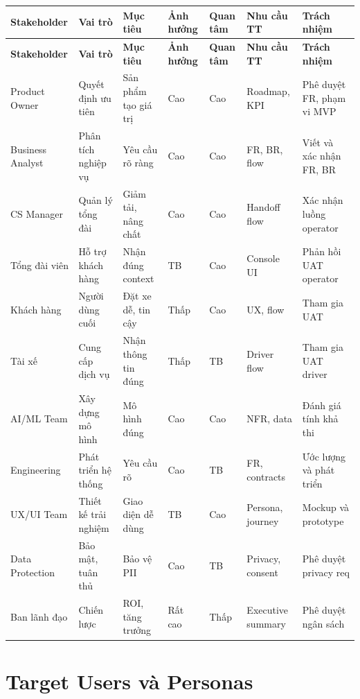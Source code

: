 \documentclass[12pt,a4paper]{article}
\begin{document}
\begin{longtable}{L{2.2cm} L{2.2cm} L{3cm} C{1.3cm} C{1.3cm} L{2.5cm} L{2.5cm}}
  \toprule
  \textbf{Stakeholder}&\textbf{Vai trò}&\textbf{Mục tiêu}&\textbf{Ảnh hưởng}&\textbf{Quan tâm}&\textbf{Nhu cầu TT}&\textbf{Trách nhiệm}\\
  \midrule\endfirsthead
  \toprule{}\textbf{Stakeholder}&\textbf{Vai trò}&\textbf{Mục tiêu}&\textbf{Ảnh hưởng}&\textbf{Quan tâm}&\textbf{Nhu cầu TT}&\textbf{Trách nhiệm}\\\midrule\endhead\bottomrule\endlastfoot
  Product Owner & Quyết định ưu tiên & Sản phẩm tạo giá trị & Cao & Cao & Roadmap, KPI & Phê duyệt FR, phạm vi MVP \\
  Business Analyst & Phân tích nghiệp vụ & Yêu cầu rõ ràng & Cao & Cao & FR, BR, flow & Viết và xác nhận FR, BR \\
  CS Manager & Quản lý tổng đài & Giảm tải, nâng chất & Cao & Cao & Handoff flow & Xác nhận luồng operator \\
  Tổng đài viên & Hỗ trợ khách hàng & Nhận đúng context & TB & Cao & Console UI & Phản hồi UAT operator \\
  Khách hàng & Người dùng cuối & Đặt xe dễ, tin cậy & Thấp & Cao & UX, flow & Tham gia UAT \\
  Tài xế & Cung cấp dịch vụ & Nhận thông tin đúng & Thấp & TB & Driver flow & Tham gia UAT driver \\
  AI/ML Team & Xây dựng mô hình & Mô hình đúng & Cao & Cao & NFR, data & Đánh giá tính khả thi \\
  Engineering & Phát triển hệ thống & Yêu cầu rõ & Cao & TB & FR, contracts & Ước lượng và phát triển \\
  UX/UI Team & Thiết kế trải nghiệm & Giao diện dễ dùng & TB & Cao & Persona, journey & Mockup và prototype \\
  Data Protection & Bảo mật, tuân thủ & Bảo vệ PII & Cao & TB & Privacy, consent & Phê duyệt privacy req \\
  Ban lãnh đạo & Chiến lược & ROI, tăng trưởng & Rất cao & Thấp & Executive summary & Phê duyệt ngân sách \\
\end{longtable}

\section{Target Users và Personas}
\end{document}
